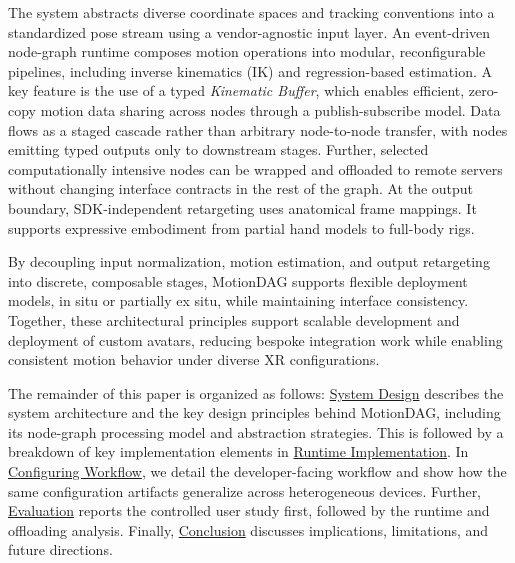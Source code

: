 The system abstracts diverse coordinate spaces and tracking conventions into a standardized pose stream using a vendor-agnostic input layer.
An event-driven node-graph runtime composes motion operations into modular, reconfigurable pipelines, including inverse kinematics (IK) and regression-based estimation.
A key feature is the use of a typed \emph{Kinematic Buffer}, which enables efficient, zero-copy motion data sharing across nodes through a publish-subscribe model.
Data flows as a staged cascade rather than arbitrary node-to-node transfer, with nodes emitting typed outputs only to downstream stages.
Further, selected computationally intensive nodes can be wrapped and offloaded to remote servers without changing interface contracts in the rest of the graph.
At the output boundary, SDK-independent retargeting uses anatomical frame mappings. 
It supports expressive embodiment from partial hand models to full-body rigs.

By decoupling input normalization, motion estimation, and output retargeting into discrete, composable stages, MotionDAG supports flexible deployment models, in situ or partially ex situ, while maintaining interface consistency.
Together, these architectural principles support scalable development and deployment of custom avatars, reducing bespoke integration work while enabling consistent motion behavior under diverse XR configurations.

The remainder of this paper is organized as follows: \hyperref[sec:systemdesign]{System Design} describes the system architecture and the key design principles behind MotionDAG, including its node-graph processing model and abstraction strategies.
This is followed by a breakdown of key implementation elements in \hyperref[sec:implementation]{Runtime Implementation}.
In \hyperref[sec:workflow]{Configuring Workflow}, we detail the developer-facing workflow and show how the same configuration artifacts generalize across heterogeneous devices.
Further, \hyperref[sec:evaluation]{Evaluation} reports the controlled user study first, followed by the runtime and offloading analysis.
Finally, \hyperref[sec:discussionandconclusion]{Conclusion} discusses implications, limitations, and future directions.
